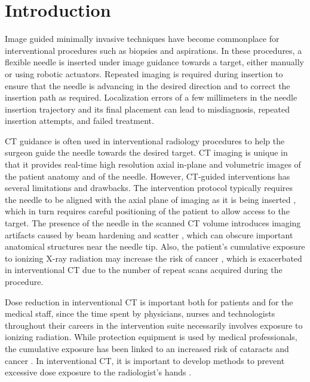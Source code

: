 \section*{Introduction}

Image guided minimally invasive techniques have become commonplace for interventional procedures such as biopsies and aspirations.
In these procedures, a flexible needle is inserted under image guidance towards a target, either manually or using robotic actuators. Repeated imaging is required during insertion to ensure that the needle is advancing in the desired direction and to correct the insertion path as required. Localization errors of a few millimeters in the needle insertion trajectory and its final placement can lead to misdiagnosis, repeated insertion attempts, and failed treatment.

CT guidance is often used in interventional radiology procedures to help the surgeon guide the needle towards the desired target. CT imaging is unique in that it provides real-time high resolution axial in-plane and volumetric images of the patient anatomy and of the needle. However, CT-guided interventions has several limitations and drawbacks. The intervention protocol typically requires the needle to be aligned with the axial plane of imaging as it is being inserted \cite{gupta2014ct}, which in turn requires careful positioning of the patient to allow access to the target.  The presence of the needle in the scanned CT volume introduces imaging artifacts caused by beam hardening and scatter \cite{boas2012ctartifacts}, which can obscure important anatomical structures near the needle tip. Also, the patient's cumulative exposure to ionizing X-ray radiation may increase the risk of cancer \cite{mettler2000ct,chodick2007excess}, which is exacerbated in interventional CT due to the number of repeat scans acquired during the procedure.

Dose reduction in interventional CT is important both for patients and for the medical staff, since the time spent by physicians, nurses and technologists throughout their careers in the intervention suite necessarily involves exposure to ionizing radiation. While protection equipment is used by medical professionals, the cumulative exposure has been linked to an increased risk of cataracts and cancer \cite{miller2010occupational, sarti2012low}. In interventional CT, it is important to develop methods to prevent excessive dose exposure to the radiologist's hands \cite{stoeckelhuber2005radiation}.

